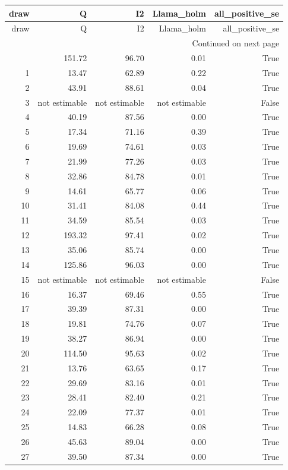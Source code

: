 \begin{longtable}{rrrrr}
\toprule
draw & Q & I2 & Llama\_holm & all\_positive\_se \\
\midrule
\endfirsthead
\toprule
draw & Q & I2 & Llama\_holm & all\_positive\_se \\
\midrule
\endhead
\midrule
\multicolumn{5}{r}{Continued on next page} \\
\midrule
\endfoot
\bottomrule
\endlastfoot
0 & 151.72 & 96.70 & 0.01 & True \\
1 & 13.47 & 62.89 & 0.22 & True \\
2 & 43.91 & 88.61 & 0.04 & True \\
3 & not estimable & not estimable & not estimable & False \\
4 & 40.19 & 87.56 & 0.00 & True \\
5 & 17.34 & 71.16 & 0.39 & True \\
6 & 19.69 & 74.61 & 0.03 & True \\
7 & 21.99 & 77.26 & 0.03 & True \\
8 & 32.86 & 84.78 & 0.01 & True \\
9 & 14.61 & 65.77 & 0.06 & True \\
10 & 31.41 & 84.08 & 0.44 & True \\
11 & 34.59 & 85.54 & 0.03 & True \\
12 & 193.32 & 97.41 & 0.02 & True \\
13 & 35.06 & 85.74 & 0.00 & True \\
14 & 125.86 & 96.03 & 0.00 & True \\
15 & not estimable & not estimable & not estimable & False \\
16 & 16.37 & 69.46 & 0.55 & True \\
17 & 39.39 & 87.31 & 0.00 & True \\
18 & 19.81 & 74.76 & 0.07 & True \\
19 & 38.27 & 86.94 & 0.00 & True \\
20 & 114.50 & 95.63 & 0.02 & True \\
21 & 13.76 & 63.65 & 0.17 & True \\
22 & 29.69 & 83.16 & 0.01 & True \\
23 & 28.41 & 82.40 & 0.21 & True \\
24 & 22.09 & 77.37 & 0.01 & True \\
25 & 14.83 & 66.28 & 0.08 & True \\
26 & 45.63 & 89.04 & 0.00 & True \\
27 & 39.50 & 87.34 & 0.00 & True \\

\end{longtable}
